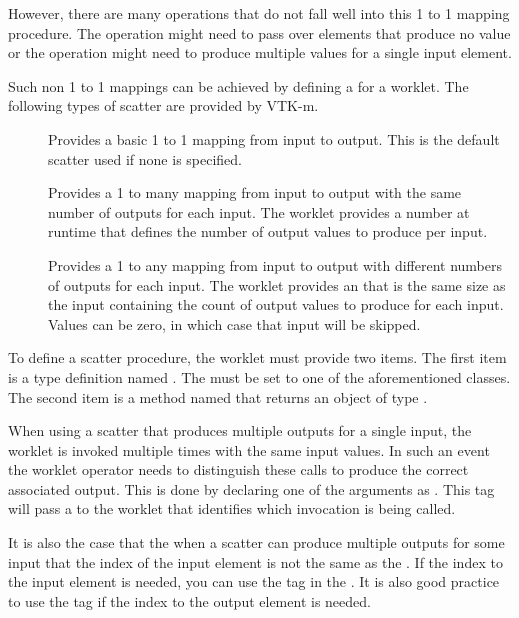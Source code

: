 However, there are many operations that do not fall well into this 1 to 1
mapping procedure. The operation might need to pass over elements that
produce no value or the operation might need to produce multiple values for
a single input element.

Such non 1 to 1 mappings can be achieved by defining a 
for a worklet. The following types of scatter are provided by VTK-m.

\begin{description}
\item[] Provides a basic 1 to 1 mapping from
  input to output. This is the default scatter used if none is specified.
\item[] Provides a 1 to many mapping from input
  to output with the same number of outputs for each input. The worklet
  provides a number at runtime that defines the number of output values to
  produce per input.
\item[] Provides a 1 to any mapping from input
  to output with different numbers of outputs for each input. The worklet
  provides an  that is the same size as the
  input containing the count of output values to produce for each input.
  Values can be zero, in which case that input will be skipped.
\end{description}

To define a scatter procedure, the worklet must provide two items. The
first item is a type definition named \scattertype. The \scattertype
must be set to one of the aforementioned
 classes. The second item is a 
method named  that returns an object of type
\scattertype.


When using a scatter that produces multiple outputs for a single input, the worklet is invoked multiple times with the same input values.
In such an event the worklet operator needs to distinguish these calls to produce the correct associated output.
This is done by declaring one of the \executionsignature arguments as  .
This tag will pass a  to the worklet that identifies which invocation is being called.

It is also the case that the when a scatter can produce multiple outputs for some input that the index of the input element is not the same as the .
If the index to the input element is needed, you can use the   tag in the \executionsignature.
It is also good practice to use the   tag if the index to the output element is needed.

